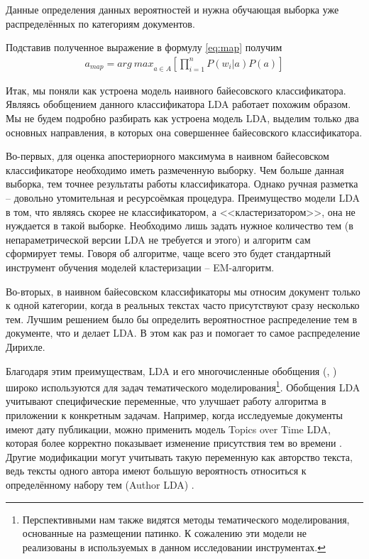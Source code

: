 Данные определения данных вероятностей и нужна обучающая выборка уже распределённых по категориям документов.

Подставив полученное выражение в формулу \ref{eq:map} получим
\begin{eqnarray}
a_{map}={arg\ max}_{a\in A} [\prod_{i=1}^nP(w_i|a)P(a)]
\end{eqnarray}

Итак, мы поняли как устроена модель наивного байесовского классификатора. Являясь обобщением данного классификатора LDA работает похожим образом. Мы не будем подробно разбирать как устроена модель LDA, выделим только два основных направления, в которых она совершеннее байесовского классификатора.

Во-первых, для оценка апостериорного максимума в наивном байесовском классификаторе необходимо иметь размеченную выборку. Чем больше данная выборка, тем точнее результаты работы классификатора. Однако ручная разметка -- довольно утомительная и ресурсоёмкая процедура. Преимущество модели LDA в том, что являясь скорее не классификатором, а <<кластеризатором>>, она не нуждается в такой выборке. Необходимо лишь задать нужное количество тем (в непараметрической версии LDA не требуется и этого) и алгоритм сам сформирует темы. Говоря об алгоритме, чаще всего это будет стандартный инструмент обучения моделей кластеризации – EM-алгоритм. %

Во-вторых, в наивном байесовском классификаторы мы относим документ только к одной категории, когда в реальных текстах часто присутствуют сразу несколько тем. Лучшим решением было бы определить вероятностное распределение тем в документе, что и делает LDA. В этом как раз и помогает то самое распределение Дирихле.

Благодаря этим преимуществам, LDA и его многочисленные обобщения (\cite{NeedlesInAHaystack}, \cite{LDASurvey}) широко используются для задач тематического моделирования\footnote{Перспективными нам также видятся методы тематического моделирования, основанные на размещении патинко. К сожалению эти модели не реализованы в используемых в данном исследовании инструментах.}.  Обобщения LDA учитывают специфические переменные, что улучшает работу алгоритма в приложении к конкретным задачам. Например, когда исследуемые документы имеют дату публикации, можно применить модель Topics over Time LDA, которая более корректно показывает изменение присутствия тем во времени \cite{ToTLDA}. Другие модификации могут учитывать такую переменную как авторство текста, ведь тексты одного автора имеют большую вероятность относиться к определённому набору тем (Author LDA) \cite{authorLDA}.

